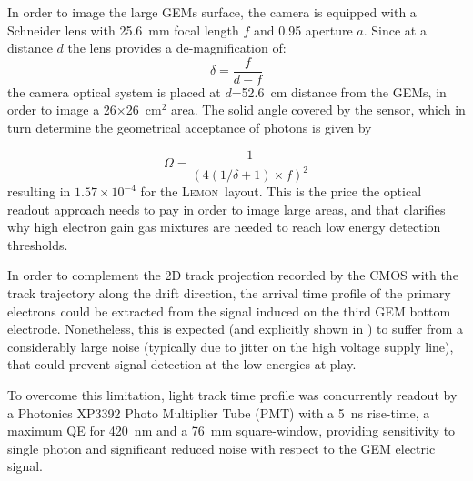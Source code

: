 \documentclass[physics,article,submit,moreauthors,pdftex]{Definitions/mdpi}
\newcommand{\lemon}{{\textsc{Lemon}}\xspace}
\begin{document}
In order to image the large GEMs surface, the camera is equipped with a Schneider lens with 25.6~mm focal length $f$ and 0.95 aperture $a$. Since at a distance $d$ the lens provides a de-magnification of:
\begin{equation}
\label{eq:demagnification}
 \delta = \frac{f}{d-f} 
\end{equation}
the camera optical system is placed at $d$=52.6~cm distance from the GEMs, in order to image a 26$\times$26~cm$^2$ area. The solid angle covered by the sensor, which in turn determine the geometrical acceptance of photons is given by

$$
\label{eq:omega}
\Omega = \frac{1}{\left(4(1/\delta+1)\times f \right)^2}
$$
resulting in $1.57 \times 10^{-4}$ for the \lemon\ layout. This is the price the optical readout approach needs to pay in order to image large areas, and that clarifies why high electron gain gas mixtures are needed to reach low energy detection thresholds.





In order to complement the 2D track projection recorded by the CMOS with the track trajectory along the drift direction, the arrival time profile of the primary electrons could be extracted from the signal induced on the third GEM bottom electrode. Nonetheless, this is expected (and explicitly shown in \cite{bib:jinst_orange2}) to suffer from a considerably large 
noise (typically due to jitter on the high voltage
supply line), that could prevent signal detection at the low energies at play.

To overcome this limitation, light track time profile was concurrently readout by a Photonics XP3392 Photo Multiplier Tube (PMT) with a 5~ns rise-time, a maximum QE for 420~nm and a 76~mm square-window, providing sensitivity to single photon and significant reduced noise with respect to the GEM electric signal. 

\end{document}
